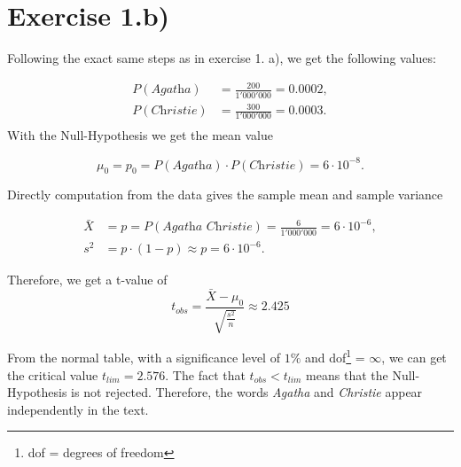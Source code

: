 \documentclass[a4paper]{article}
\begin{document}
\section*{Exercise 1.b)}
Following the exact same steps as in exercise 1. a), we get the following values:

\begin{align*}
P(\textit{Agatha}) &= \frac{200}{1'000'000} = 0.0002, \\
P(\textit{Christie}) &= \frac{300}{1'000'000} = 0.0003. \\
\end{align*}
With the Null-Hypothesis we get the mean value

$$\mu_0 = p_0 = P(\textit{Agatha}) \cdot P(\textit{Christie}) = 6 \cdot 10^{-8}.$$

\noindent Directly computation from the data gives the sample mean and sample variance

\begin{align*}
\bar{X} &= p = P(\textit{Agatha Christie}) = \frac{6}{1'000'000} = 6 \cdot 10^{-6}, \\
s^2 &= p \cdot (1-p) \approx p = 6 \cdot 10^{-6}.
\end{align*}

\noindent Therefore, we get a t-value of 
$$t_{obs} = \frac{\bar{X} - \mu_0}{\sqrt{\frac{s^2}{n}}} \approx 2.425 $$


\noindent From the normal table, with a significance level of $1\%$ and dof\footnote{dof = degrees of freedom} = $\infty$, we can get the critical value $t_{lim} = 2.576$. The fact that $t_{obs} < t_{lim}$ means that the Null-Hypothesis is not rejected. Therefore, the words \textit{Agatha} and \textit{Christie} appear independently in the text.
\end{document}
